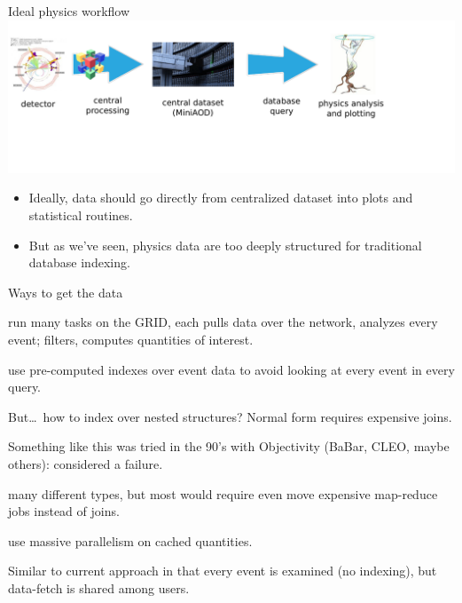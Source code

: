\documentclass{beamer}
\begin{document}
\begin{frame}{Ideal physics workflow}
\vspace{0.5 cm}
\includegraphics[width=\linewidth]{workflow3.pdf}

\vspace{0.25 cm}
\begin{itemize}
\item Ideally, data should go directly from centralized dataset into plots and statistical routines.
\item<2-> But as we've seen, physics data are too deeply structured for traditional database indexing.
\end{itemize}

\vspace{1 cm}
\end{frame}

\begin{frame}{Ways to get the data}
\vspace{0.25 cm}
\small
\begin{description}\setlength{\itemsep}{0.2 cm}
\item[Parallel scripts (current):] run many tasks on the GRID, each pulls data over the network, analyzes every event; filters, computes quantities of interest.

\item[Relational database:]<2-> use pre-computed indexes over event data to avoid looking at every event in every query.

\vspace{0.1 cm}
But\ldots\ how to index over nested structures? Normal form requires expensive joins.

\vspace{0.1 cm}
Something like this was tried in the 90's with Objectivity (BaBar, CLEO, maybe others): considered a failure.

\item[NoSQL databases:]<3-> many different types, but most would require even move expensive map-reduce jobs instead of joins.

\item[GPU database:]<4-> use massive parallelism on cached quantities.

\vspace{0.1 cm}
Similar to current approach in that every event is examined (no indexing), but data-fetch is shared among users.
\end{description}
\end{frame}
\end{document}
